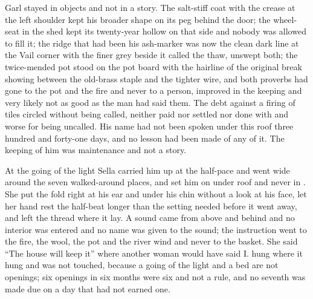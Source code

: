 Garl stayed in objects and not in a story. The salt-stiff coat with the crease at the left shoulder kept his broader shape on its peg behind the door; the wheel-seat in the shed kept its twenty-year hollow on that side and nobody was allowed to fill it; the ridge that had been his ash-marker was now the clean dark line at the Vail corner with the finer grey beside it called the thaw, unswept both; the twice-mended pot stood on the pot board with the hairline of the original break showing between the old-brass staple and the tighter wire, and both proverbs had gone to the pot and the fire and never to a person, improved in the keeping and very likely not as good as the man had said them. The debt against a firing of tiles circled without being called, neither paid nor settled nor done with and worse for being uncalled. His name had not been spoken under this roof three hundred and forty-one days, and no lesson had been made of any of it. The keeping of him was maintenance and not a story.

At the going of the light Sella carried him up at the half-pace and went wide around the seven walked-around places, and set him on  under  roof and never in . She put the fold right at his ear and under his chin without a look at his face, let her hand rest the half-beat longer than the setting needed before it went away, and left the thread where it lay. A sound came from above and behind and no interior was entered and no name was given to the sound; the instruction went to the fire, the wool, the pot and the river wind and never to the basket. She said “The house will keep it” where another woman would have said I.  hung where it hung and was not touched, because a going of the light and a bed are not openings; six openings in six months were six and not a rule, and no seventh was made due on a day that had not earned one.

